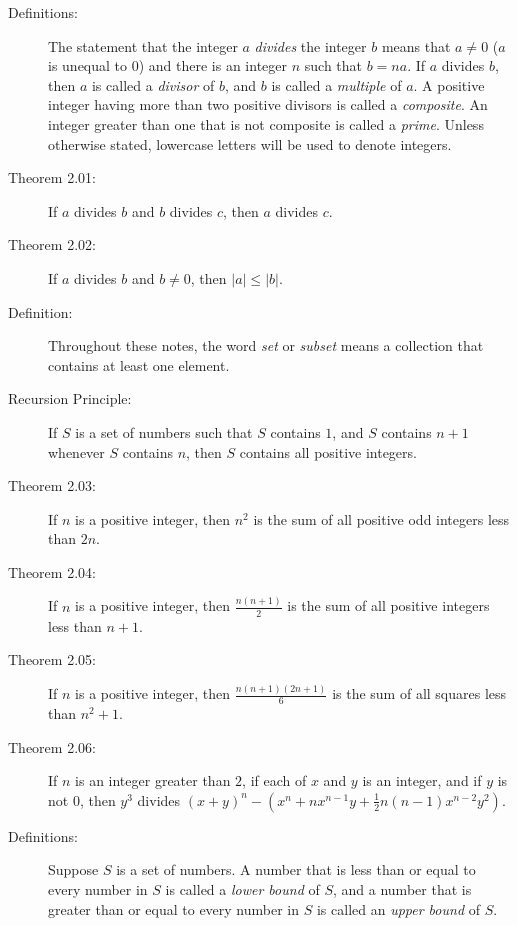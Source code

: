\documentclass{article}
\begin{document}
\begin{description}

  \item[Definitions:] The statement that the integer $a$ \emph{divides} the integer $b$ means that $a \neq 0$ ($a$ is unequal to $0$) and there is an integer $n$ such that $b=na$. If $a$ divides $b$, then $a$ is called a \emph{divisor} of $b$, and $b$ is called a \emph{multiple} of $a$. A positive integer having more than two positive divisors is called a \emph{composite}. An integer greater than one that is not composite is called a \emph{prime}. Unless otherwise stated, lowercase letters will be used to denote integers.

  \item[Theorem 2.01:] If $a$ divides $b$ and $b$ divides $c$, then $a$ divides $c$.

  \item[Theorem 2.02:] If $a$ divides $b$ and $b \neq 0$, then $\vert a \vert \leq \vert b \vert$.

  \item[Definition:] Throughout these notes, the word \emph{set} or \emph{subset} means a collection that contains at least one element.

  \item[Recursion Principle:] If $S$ is a set of numbers such that $S$ contains $1$, and $S$ contains $n+1$ whenever $S$ contains $n$, then $S$ contains all positive integers. 

  \item[Theorem 2.03:] If $n$ is a positive integer, then $n^2$ is the sum of all positive odd integers less than $2n$.

  \item[Theorem 2.04:] If $n$ is a positive integer, then $\frac{n(n+1)}{2}$ is the sum of all positive integers less than $n+1$.

  \item[Theorem 2.05:] If $n$ is a positive integer, then $\frac{n(n+1)(2n+1)}{6}$ is the sum of all squares less than $n^2+1$.

  \item[Theorem 2.06:] If $n$ is an integer greater than $2$, if each of $x$ and $y$ is an integer, and if $y$ is not $0$, then $y^3$ divides $(x+y)^n-(x^n+ nx^{n-1}y + \frac{1}{2} n(n-1)x^{n-2} y^2)$.

  \item[Definitions:] Suppose $S$ is a set of numbers. A number that is less than or equal to every number in $S$ is called a \emph{lower bound} of $S$, and a number that is greater than or equal to every number in $S$ is called an \emph{upper bound} of $S$.


\end{description}
\end{document}
